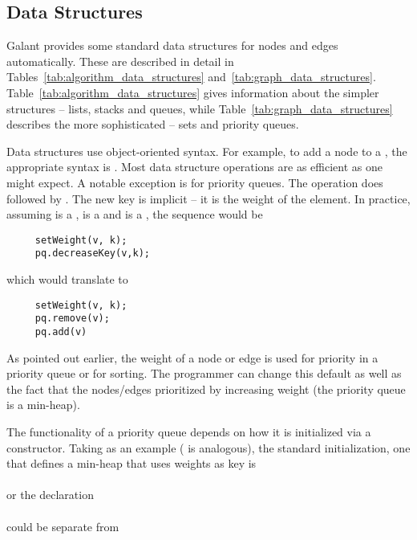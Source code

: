 

\subsection{Data Structures}

Galant provides some standard data structures for nodes and edges automatically.
These are described in detail in Tables~\ref{tab:algorithm_data_structures} and~\ref{tab:graph_data_structures}.
Table~\ref{tab:algorithm_data_structures} gives information about the simpler
structures -- lists, stacks and queues,
while Table~\ref{tab:graph_data_structures} describes the more sophisticated
-- sets and priority queues.

Data structures use object-oriented syntax.
For example, to add a node  to a  ,
the appropriate syntax is .
Most data structure operations are as efficient as one might expect.
A notable exception is 
for priority queues.
The operation 
does  followed by .
The new key is implicit -- it is the weight of the element.
In practice, assuming  is a ,
 is a 
and  is a , the sequence would be
\begin{verbatim}
     setWeight(v, k);
     pq.decreaseKey(v,k);
\end{verbatim}
which would translate to
\begin{verbatim}
     setWeight(v, k);
     pq.remove(v);
     pq.add(v)
\end{verbatim}
As pointed out earlier,
the weight of a node or edge is used for priority in a priority
queue or for sorting.
The programmer can change this default
as well as the fact that the nodes/edges prioritized by increasing weight
(the priority queue is a min-heap).

The functionality of a priority queue depends on how it is initialized via a
constructor. Taking  as an example
( is analogous), the standard initialization, one
that defines a min-heap that uses weights as key is\\
\\
or the
declaration\\
\\
could be separate from\\
\\

